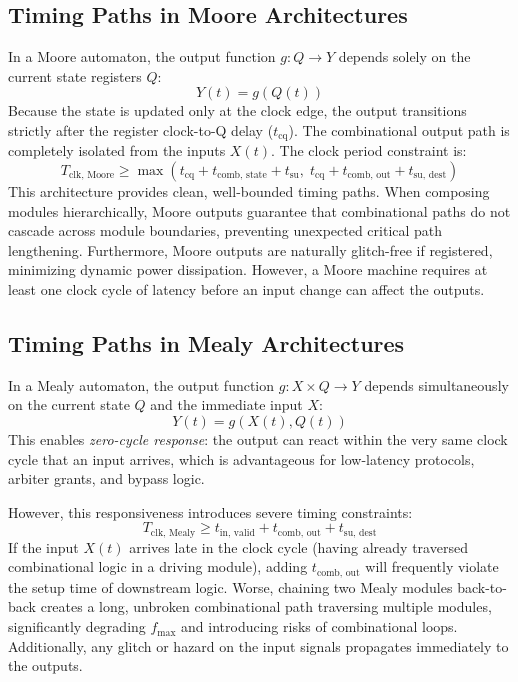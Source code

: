 \subsection{Timing Paths in Moore Architectures}
In a Moore automaton, the output function $g: Q \rightarrow Y$ depends solely on the current state registers $Q$:
\begin{equation}
Y(t) = g(Q(t))
\end{equation}
Because the state is updated only at the clock edge, the output transitions strictly after the register clock-to-Q delay ($t_{\text{cq}}$). The combinational output path is completely isolated from the inputs $X(t)$. The clock period constraint is:
\begin{equation}
T_{\text{clk, Moore}} \ge \max\left( t_{\text{cq}} + t_{\text{comb, state}} + t_{\text{su}}, \; t_{\text{cq}} + t_{\text{comb, out}} + t_{\text{su, dest}} \right)
\end{equation}
This architecture provides clean, well-bounded timing paths. When composing modules hierarchically, Moore outputs guarantee that combinational paths do not cascade across module boundaries, preventing unexpected critical path lengthening. Furthermore, Moore outputs are naturally glitch-free if registered, minimizing dynamic power dissipation. However, a Moore machine requires at least one clock cycle of latency before an input change can affect the outputs.

\subsection{Timing Paths in Mealy Architectures}
In a Mealy automaton, the output function $g: X \times Q \rightarrow Y$ depends simultaneously on the current state $Q$ and the immediate input $X$:
\begin{equation}
Y(t) = g(X(t), Q(t))
\end{equation}
This enables \textit{zero-cycle response}: the output can react within the very same clock cycle that an input arrives, which is advantageous for low-latency protocols, arbiter grants, and bypass logic.

However, this responsiveness introduces severe timing constraints:
\begin{equation}
T_{\text{clk, Mealy}} \ge t_{\text{in, valid}} + t_{\text{comb, out}} + t_{\text{su, dest}}
\end{equation}
If the input $X(t)$ arrives late in the clock cycle (having already traversed combinational logic in a driving module), adding $t_{\text{comb, out}}$ will frequently violate the setup time of downstream logic. Worse, chaining two Mealy modules back-to-back creates a long, unbroken combinational path traversing multiple modules, significantly degrading $f_{\max}$ and introducing risks of combinational loops. Additionally, any glitch or hazard on the input signals propagates immediately to the outputs.

